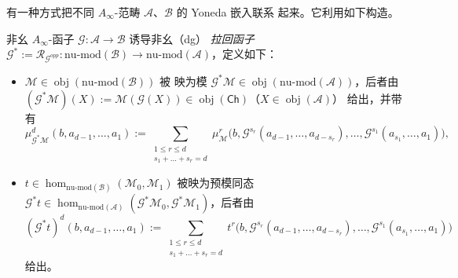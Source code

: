 有一种方式把不同 $A_\infty$-范畴 $\mathcal A$、$\mathcal B$ 的 Yoneda 嵌入联系
起来。它利用如下构造。

\begin{Def}\label{def:2.37}
非幺 $A_\infty$-函子 $\mathcal G:\mathcal A\to\mathcal B$ 诱导非幺（dg）
\emph{拉回函子} $\mathcal G^*:=\mathcal R_{\mathcal G^{opp}}:\mathrm{nu\text{-}mod}
(\mathcal B)\to\mathrm{nu\text{-}mod}(\mathcal A)$，定义如下：
\begin{itemize}
  \item $\mathcal M\in\operatorname{obj}(\mathrm{nu\text{-}mod}(\mathcal B))$ 被
        映为模 $\mathcal G^*\mathcal M\in\operatorname{obj}(\mathrm{nu\text{-}mod}
        (\mathcal A))$，后者由 $(\mathcal G^*\mathcal M)(X):=\mathcal M(\mathcal G(X))
        \in\operatorname{obj}(\mathsf{Ch})$（$X\in\operatorname{obj}(\mathcal A)$）
        给出，并带有
        \[
          \mu^d_{\mathcal G^*\mathcal M}(b,a_{d-1},\dots,a_1):=
          \sum_{\substack{1\le r\le d\\ s_1+\dots+s_r=d}}
          \mu^r_{\mathcal M}\bigl(b,\mathcal G^{s_r}(a_{d-1},\dots,a_{d-s_r}),
          \dots,\mathcal G^{s_1}(a_{s_1},\dots,a_1)\bigr),
        \]
  \item $t\in\hom_{\mathrm{nu\text{-}mod}(\mathcal B)}(\mathcal M_0,\mathcal M_1)$
        被映为预模同态 $\mathcal G^*t\in\hom_{\mathrm{nu\text{-}mod}(\mathcal A)}
        (\mathcal G^*\mathcal M_0,\mathcal G^*\mathcal M_1)$，后者由
        \[
          (\mathcal G^*t)^d(b,a_{d-1},\dots,a_1):=
          \sum_{\substack{1\le r\le d\\ s_1+\dots+s_r=d}}
          t^r\bigl(b,\mathcal G^{s_r}(a_{d-1},\dots,a_{d-s_r}),\dots,
          \mathcal G^{s_1}(a_{s_1},\dots,a_1)\bigr)
        \]
        给出。
\end{itemize}
\end{Def}

